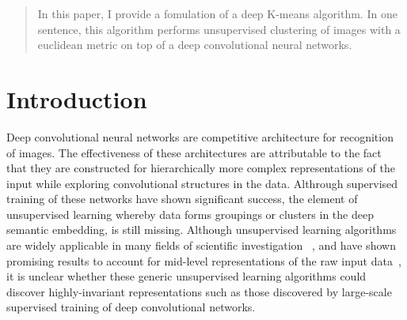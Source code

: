 \documentclass{article}
\begin{document}
 


\begin{abstract} 
  In this paper, I provide a fomulation of a deep K-means algorithm. 
  In one sentence, this algorithm performs unsupervised clustering of 
  images with a euclidean metric on top of a deep convolutional neural 
  networks. 
\end{abstract} 

\section{Introduction} 
\label{intro} 

Deep convolutional neural networks are competitive architecture for
recognition of images. The effectiveness of these architectures are
attributable to the fact that they are constructed for hierarchically
more complex representations of the input while exploring
convolutional structures in the data. Althrough supervised training of
these networks have shown significant success, the element of
unsupervised learning whereby data forms groupings or clusters in the
deep semantic embedding, is still missing. Although unsupervised
learning algorithms are widely applicable in many fields of scientific
investigation ~\cite{}, and have shown promising results to account
for mid-level representations of the raw input data~\cite{}, it is
unclear whether these generic unsupervised learning algorithms could
discover highly-invariant representations such as those discovered by
large-scale supervised training of deep convolutional networks. 
\end{document}

